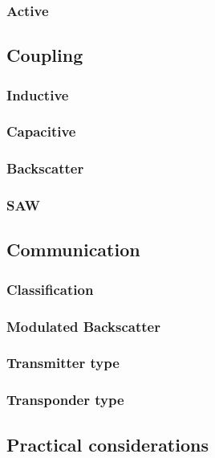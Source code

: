 \subsubsection{Active}

\subsection{Coupling}
\subsubsection{Inductive}
\subsubsection{Capacitive}
\subsubsection{Backscatter}
\subsubsection{SAW}

\subsection{Communication}

\subsubsection{Classification}

\subsubsection{Modulated Backscatter}
\subsubsection{Transmitter type}
\subsubsection{Transponder type}

\subsection{Practical considerations}


